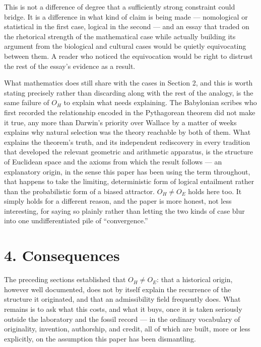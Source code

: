\documentclass[11pt]{article}
\theoremstyle{plain}
\begin{document}
This is not a difference of degree that a sufficiently strong constraint could bridge. It is a difference in what kind of claim is being made --- nomological or statistical in the first case, logical in the second --- and an essay that traded on the rhetorical strength of the mathematical case while actually building its argument from the biological and cultural cases would be quietly equivocating between them. A reader who noticed the equivocation would be right to distrust the rest of the essay's evidence as a result.

What mathematics does still share with the cases in Section 2, and this is worth stating precisely rather than discarding along with the rest of the analogy, is the same failure of \(O_H\) to explain what needs explaining. The Babylonian scribes who first recorded the relationship encoded in the Pythagorean theorem did not make it true, any more than Darwin's priority over Wallace by a matter of weeks explains why natural selection was the theory reachable by both of them. What explains the theorem's truth, and its independent rediscovery in every tradition that developed the relevant geometric and arithmetic apparatus, is the structure of Euclidean space and the axioms from which the result follows --- an explanatory origin, in the sense this paper has been using the term throughout, that happens to take the limiting, deterministic form of logical entailment rather than the probabilistic form of a biased attractor. \(O_H \neq O_E\) holds here too. It simply holds for a different reason, and the paper is more honest, not less interesting, for saying so plainly rather than letting the two kinds of case blur into one undifferentiated pile of ``convergence.''

\section*{4. Consequences}

The preceding sections established that \(O_H \neq O_E\): that a historical origin, however well documented, does not by itself explain the recurrence of the structure it originated, and that an admissibility field frequently does. What remains is to ask what this costs, and what it buys, once it is taken seriously outside the laboratory and the fossil record --- in the ordinary vocabulary of originality, invention, authorship, and credit, all of which are built, more or less explicitly, on the assumption this paper has been dismantling.
\end{document}
